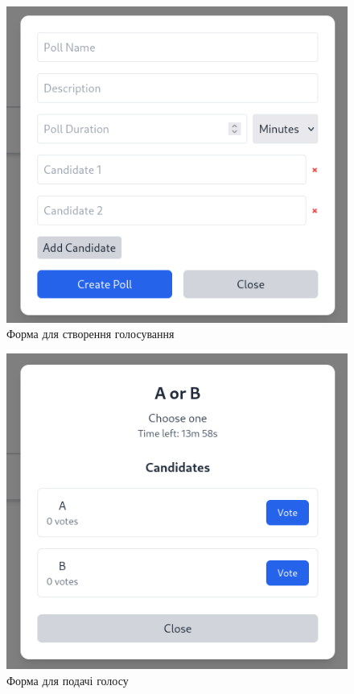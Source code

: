 \documentclass[14pt]{extreport}
\begin{document}
  \begin{figure}[H]
    \centering
    \includegraphics[scale=0.5]{UICreate}
    \caption{Форма для створення голосування}
    \label{fig:UICreate}
  \end{figure}
  
  \begin{figure}[H]
    \centering
    \includegraphics[scale=0.5]{UIVote}
    \caption{Форма для подачі голосу}
    \label{fig:UIVote}
  \end{figure}
  
\end{document}
